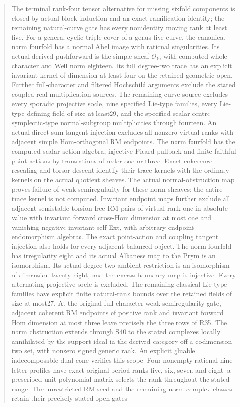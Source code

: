 \documentclass[11pt]{article}
\begin{document}
\begin{abstract}
The terminal rank-four tensor alternative for missing sixfold components
is closed by actual block induction and an exact ramification identity;
the remaining natural-curve gate has every nonidentity moving rank at least five.
For a general cyclic triple cover of a genus-five curve, the canonical norm
fourfold has a normal Abel image with rational singularities. Its actual
derived pushforward is the simple sheaf $\mathcal O_Y$, with computed whole
character and Weil norm eighteen. Its full degree-two trace has an explicit
invariant kernel of dimension at least four on the retained geometric open.
Further full-character and filtered Hochschild arguments exclude the stated
coupled real-multiplication sources.
The remaining curve source excludes every sporadic projective socle,
nine specified Lie-type families, every Lie-type defining field of size
at least29, and the specified scalar-centre symplectic-type normal-subgroup
multiplicities through fourteen. An actual direct-sum tangent injection excludes
all nonzero virtual ranks with adjacent simple Hom-orthogonal RM endpoints.
The norm fourfold has the computed scalar-action algebra, injective
Picard pullback and finite faithful point actions by translations of order
one or three. Exact coherence rescaling and torsor descent identify their
trace kernels with the ordinary kernels on the actual quotient sheaves.
The actual normal-obstruction map proves failure of weak semiregularity
for these norm sheaves; the entire trace kernel is not computed.
Invariant endpoint maps further exclude all adjacent semistable
torsion-free RM pairs of virtual rank one in absolute value with
invariant forward cross-Hom dimension at most one and vanishing
negative invariant self-Ext, with arbitrary endpoint endomorphism
algebras. The exact point-action and coupling tangent injection
also holds for every adjacent balanced object. The norm fourfold
has irregularity eight and its actual Albanese map to the Prym
is an isomorphism. Its actual degree-two ambient restriction is an
isomorphism of dimension twenty-eight, and the excess boundary
map is injective. Every alternating projective socle is excluded.
The remaining classical Lie-type families have explicit finite natural-rank
bounds over the retained fields of size at most27.
At the original full-character weak semiregularity gate, adjacent
coherent RM endpoints of positive rank and invariant forward Hom
dimension at most three leave precisely the three rows of R35.
The norm obstruction extends through S40 to the stated complexes
locally annihilated by the support ideal in the derived category
off a codimension-two set, with nonzero signed generic rank.
An explicit gluable indecomposable dual cone verifies this scope.
Four nonempty rational nine-letter profiles have exact original
period ranks five, six, seven and eight; a prescribed-unit
polynomial matrix selects the rank throughout the stated range.
The unrestricted RM seed and the remaining norm-complex classes
retain their precisely stated open gates.
\end{abstract}
\tableofcontents

\end{document}
